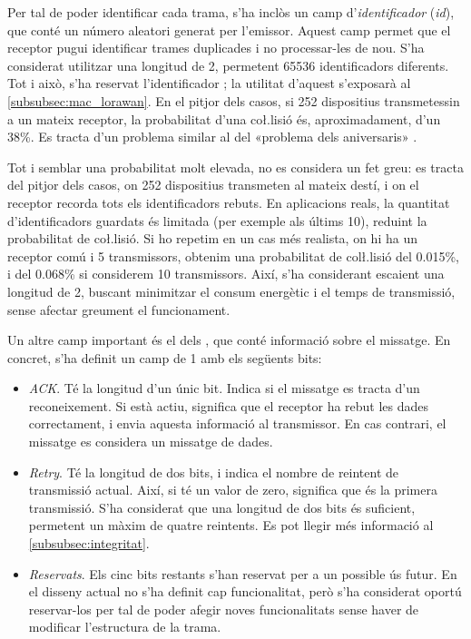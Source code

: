 \documentclass{tfgitic}[2024/07/01]
\begin{document}
Per tal de poder identificar cada trama, s'ha inclòs un camp d'\emph{identificador} (\emph{id}), que conté un número aleatori generat per l'emissor. Aquest camp permet que el receptor pugui identificar trames duplicades i no processar-les de nou. S'ha considerat utilitzar una longitud de \SI{2}{\byte}, permetent 65536 identificadors diferents. Tot i això, s'ha reservat l'identificador ; la utilitat d'aquest s'exposarà al \autoref{subsubsec:mac_lorawan}. En el pitjor dels casos, si 252 dispositius transmetessin a un mateix receptor, la probabilitat d'una co\l.lisió és, aproximadament, d'un 38\%. Es tracta d'un problema similar al del «problema dels aniversaris» \cite{noauthor_birthday_2025}.

Tot i semblar una probabilitat molt elevada, no es considera un fet greu: es tracta del pitjor dels casos, on 252 dispositius transmeten al mateix destí, i on el receptor recorda tots els identificadors rebuts. En aplicacions reals, la quantitat d'identificadors guardats és limitada (per exemple als últims 10), reduint la probabilitat de co\l.lisió. Si ho repetim en un cas més realista, on hi ha un receptor comú i 5 transmissors, obtenim una probabilitat de col\l.lisió del 0.015\%, i del 0.068\% si considerem 10 transmissors. Així, s'ha considerant escaient una longitud de \SI{2}{\byte}, buscant minimitzar el consum energètic i el temps de transmissió, sense afectar greument el funcionament.

Un altre camp important és el dels , que conté informació sobre el missatge. En concret, s'ha definit un camp de \SI{1}{\byte} amb els següents bits:
\begin{itemize}
    \item \emph{ACK}. Té la longitud d'un únic bit. Indica si el missatge es tracta d'un reconeixement. Si està actiu, significa que el receptor ha rebut les dades correctament, i envia aquesta informació al transmissor. En cas contrari, el missatge es considera un missatge de dades.
    \item \emph{Retry}. Té la longitud de dos bits, i indica el nombre de reintent de transmissió actual. Així, si té un valor de zero, significa que és la primera transmissió. S'ha considerat que una longitud de dos bits és suficient, permetent un màxim de quatre reintents. Es pot llegir més informació al \autoref{subsubsec:integritat}.
    \item \emph{Reservats}. Els cinc bits restants s'han reservat per a un possible ús futur. En el disseny actual no s'ha definit cap funcionalitat, però s'ha considerat oportú reservar-los per tal de poder afegir noves funcionalitats sense haver de modificar l'estructura de la trama.
\end{itemize}
\end{document}
